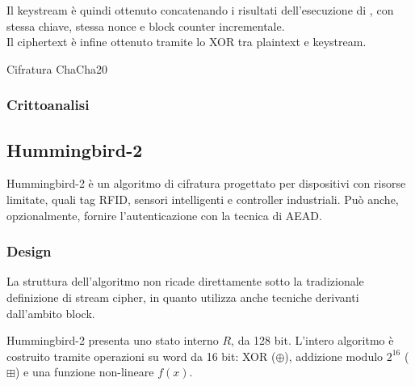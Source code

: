 \documentclass[target=bach,aauheader=,style=]{thud}
\begin{document}
			Il keystream è quindi ottenuto concatenando i risultati dell'esecuzione di , con stessa chiave, stessa nonce e block counter incrementale.\\
			Il ciphertext è infine ottenuto tramite lo XOR tra plaintext e keystream.
			
			\begin{algorithm}
				\caption{Cifratura ChaCha20}
				\begin{algorithmic}
						\EndFor
					\EndProcedure
				\end{algorithmic}
			\end{algorithm}
			
			\subsubsection{Crittoanalisi}
		\subsection{Hummingbird-2\cite{hummingbird2}}
		Hummingbird-2 è un algoritmo di cifratura progettato per dispositivi con risorse limitate, quali tag RFID, sensori intelligenti e controller industriali. Può anche, opzionalmente, fornire l'autenticazione con la tecnica di AEAD.
			\subsubsection{Design}
			La struttura dell'algoritmo non ricade direttamente sotto la tradizionale definizione di stream cipher, in quanto utilizza anche tecniche derivanti dall'ambito block.
			
			Hummingbird-2 presenta uno stato interno $R$, da 128 bit. L'intero algoritmo è costruito tramite operazioni su word da 16 bit: XOR ($\oplus$), addizione modulo $2^{16}$ ($\boxplus$) e una funzione non-lineare $f(x)$.
			
\end{document}
